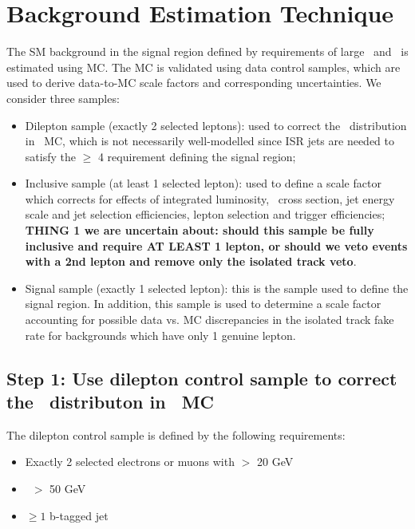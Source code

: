 \clearpage

\section{Background Estimation Technique}

The SM background in the signal region defined by requirements of large \MET\ and \mt\ is estimated using MC.
The MC is validated using data control samples, which are used to derive data-to-MC scale factors and corresponding uncertainties.
We consider three samples:

\begin{itemize}
\item Dilepton sample (exactly 2 selected leptons): used to correct the \njets\ distribution in \ttll\ MC, which is not necessarily well-modelled since ISR jets 
are needed to satisfy the \njets $\geq$ 4 requirement defining the signal region;
\item Inclusive sample (at least 1 selected lepton): used to define a scale factor which corrects for effects of integrated luminosity, \ttbar\ cross section,
jet energy scale and jet selection efficiencies, lepton selection and trigger efficiencies; 
{\bf THING 1 we are uncertain about: should this sample be fully inclusive and require AT LEAST 1 lepton, or should we veto events with a 2nd lepton and remove only the isolated track veto}.
\item Signal sample (exactly 1 selected lepton): this is the sample used to define the signal region. In addition, this sample is used to determine a scale 
factor accounting for possible data vs. MC discrepancies in the isolated track fake rate for backgrounds which have only 1 genuine lepton.
\end{itemize}

\subsection{Step 1: Use dilepton control sample to correct the \njets\ distributon in \ttll\ MC}

The dilepton control sample is defined by the following requirements:
\begin{itemize}
\item Exactly 2 selected electrons or muons with \pt $>$ 20 GeV
\item \MET\ $>$ 50 GeV
\item $\geq1$ b-tagged jet
\end{itemize}

